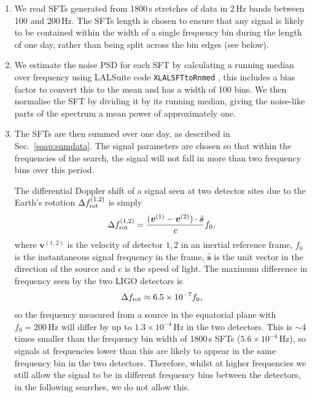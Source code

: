 \begin{enumerate}
%
\item We read \glspl{SFT} generated from 1800\,s stretches of data in 2\,Hz
    bands between 100 and 200\,Hz. The \glspl{SFT} length is chosen to ensure that any signal is likely to be contained within the width of a single
    frequency bin during the length of one day, rather than being split
    across the bin edges (see below).
%
\item We estimate the noise \gls{PSD} for each \gls{SFT} by calculating a
    running median over frequency using LALSuite
    code {\tt XLALSFTtoRnmed} \citep{ligoscientificcollaboration2018LIGOAlgorithm}, this includes a bias factor to
    convert this to the mean and has a width of 100 bins. We then normalise the \gls{SFT} by dividing it
    by its running median, giving the noise-like parts of the spectrum a
    mean power of approximately one.

\item The \glspl{SFT} are then summed over one day, as described in
    Sec.~\ref{soap:sumdata}. The signal parameters are chosen so that
    within the frequencies of the search, the signal will not fall in more than two frequency bins over this
    period.

    The differential Doppler shift of a signal seen at two detector sites due to the Earth's rotation $\Delta f^{(1,2)}_{\rm{rot}}$ is simply
%
\begin{equation} \label{soap:results:doppler}
\Delta f^{(1,2)}_{\rm{rot}} = \frac{({{\bm v}^{(1)}} -{{\bm v}^{(2)}})\cdot
\hat{\bm s}}{c} f_0,
\end{equation}
%
where ${\bm v}^{(1,2)}$ is the velocity of detector $1,2$ in an inertial reference frame, $f_0$ is the
instantaneous signal frequency in the frame, $\hat{\bm s}$ is the unit vector in the direction of the source and  $c$ is the speed of light.
The maximum difference in frequency seen by the two \gls{LIGO} detectors
is 
\begin{equation} \label{soap:results:doppler:diff}
\Delta f_{\rm rot} \approx 6.5\times 10^{-7} f_0,
\end{equation}
%
so the frequency measured from a source in the equatorial plane with $f_0=200$\,Hz will differ by up to $1.3 \times 10^{-4}$\,Hz in the two detectors.
This is $\sim 4$ times smaller than the frequency bin width of 1800\,s \glspl{SFT} ($5.6 \times
10^{-4}$\,Hz), so signals at frequencies lower than this are likely to appear in the same frequency bin in the two detectors. Therefore, whilst at higher frequencies we still allow the signal to be in different frequency bins between the detectors, in the following searches, we do not allow this.
%


\end{enumerate}
